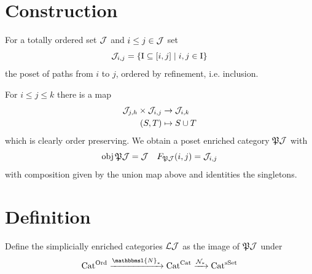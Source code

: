     \section{Construction}
        For a totally ordered set $\mathcal{J}$ and $i \leq j \in \mathcal{J}$ set
        \begin{equation*}
            \mathcal{J}_{i,j} = \left\{ \mathrm{I} \subseteq [i, j] \mid i, j \in \mathrm{I} \right\}
        \end{equation*}
        the poset of paths from $i$ to $j$, ordered by refinement, i.e. inclusion.
        \smallskip

        For $i \leq j \leq k$ there is a map
        \begin{align*}
            \mathcal{J}_{j,h} \times \mathcal{J}_{i,j} &\to \mathcal{J}_{i,k} \\
              (S, T) &\mapsto S \cup T
        \end{align*}
        which is clearly order preserving. We obtain a poset enriched category $\mathfrak{P}\mathcal{J}$ with
        \begin{equation*}
            \operatorname{obj} \mathfrak{P}\mathcal{J} = \mathcal{J} \quad F_{\mathfrak{P}\mathcal{J}}(i, j) = \mathcal{J}_{i,j}
        \end{equation*}
        with composition given by the union map above and identities the singletons.

    \section{Definition}
        Define the simplicially enriched categories $\mathcal{L}{\mathcal{J}}$ as the image of $\mathfrak{P}\mathcal{J}$ under
        \begin{equation*}
            \Cat^{\Ord} \xrightarrow{\mathbbmsl{N}_{*}} \Cat^{\Cat} \xrightarrow{\Nn_{*}} \Cat^{\sSet}
        \end{equation*}


